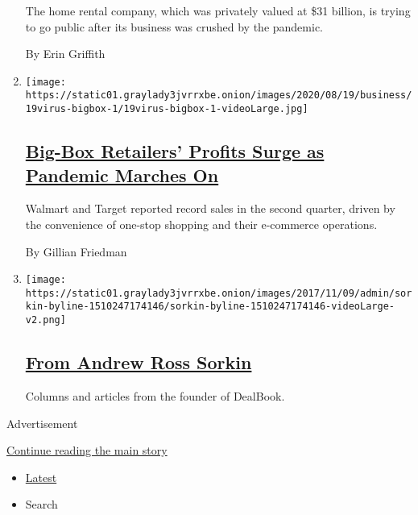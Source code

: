 \begin{enumerate}
  The home rental company, which was privately valued at \$31 billion,
  is trying to go public after its business was crushed by the pandemic.

  By Erin Griffith
\item
  \texttt{[image: https://static01.graylady3jvrrxbe.onion/images/2020/08/19/business/19virus-bigbox-1/19virus-bigbox-1-videoLarge.jpg]}

  \hypertarget{big-box-retailers-profits-surge-as-pandemic-marches-on}{%
  \subsection{\texorpdfstring{\href{/2020/08/19/business/coronavirus-walmart-target-home-depot.html}{Big-Box
  Retailers' Profits Surge as Pandemic Marches
  On}}{Big-Box Retailers' Profits Surge as Pandemic Marches On}}\label{big-box-retailers-profits-surge-as-pandemic-marches-on}}

  Walmart and Target reported record sales in the second quarter, driven
  by the convenience of one-stop shopping and their e-commerce
  operations.

  By Gillian Friedman
\item
  \texttt{[image: https://static01.graylady3jvrrxbe.onion/images/2017/11/09/admin/sorkin-byline-1510247174146/sorkin-byline-1510247174146-videoLarge-v2.png]}

  \hypertarget{from-andrew-ross-sorkin}{%
  \subsection{\texorpdfstring{\href{/interactive/2017/business/dealbook/sorkin-byline.html}{From
  Andrew Ross
  Sorkin}}{From Andrew Ross Sorkin}}\label{from-andrew-ross-sorkin}}

  Columns and articles from the founder of DealBook.
\end{enumerate}

Advertisement

\protect\hyperlink{after-mid1}{Continue reading the main story}

\begin{itemize}
\tightlist
\item
  \protect\hyperlink{stream-panel}{Latest}
\item
  Search
\end{itemize}

